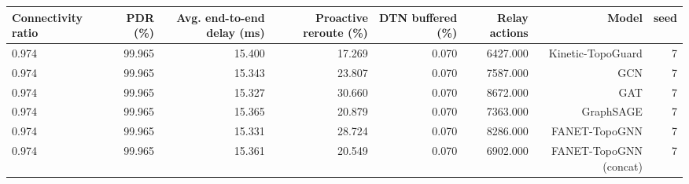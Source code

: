 \begin{tabular}{lrrrrrrr}
\toprule
Connectivity ratio & PDR (\%) & Avg. end-to-end delay (ms) & Proactive reroute (\%) & DTN buffered (\%) & Relay actions & Model & seed \\
\midrule
0.974 & 99.965 & 15.400 & 17.269 & 0.070 & 6427.000 & Kinetic-TopoGuard & 7 \\
0.974 & 99.965 & 15.343 & 23.807 & 0.070 & 7587.000 & GCN & 7 \\
0.974 & 99.965 & 15.327 & 30.660 & 0.070 & 8672.000 & GAT & 7 \\
0.974 & 99.965 & 15.365 & 20.879 & 0.070 & 7363.000 & GraphSAGE & 7 \\
0.974 & 99.965 & 15.331 & 28.724 & 0.070 & 8286.000 & FANET-TopoGNN & 7 \\
0.974 & 99.965 & 15.361 & 20.549 & 0.070 & 6902.000 & FANET-TopoGNN (concat) & 7 \\
\bottomrule
\end{tabular}